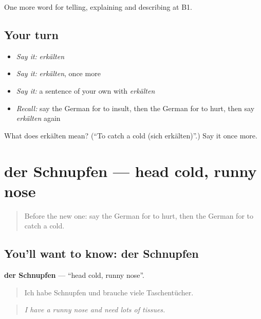 \begin{grammarlens}[title={What you've built}]
One more word for telling, explaining and describing at B1.
\end{grammarlens}

\subsection*{Your turn}
\begin{itemize}
\raggedright
  \item \emph{Say it:} \emph{erkälten}
  \item \emph{Say it:} \emph{erkälten}, once more
  \item \emph{Say it:} a sentence of your own with \emph{erkälten}
  \item \emph{Recall:} say the German for to insult, then the German for to hurt, then say \emph{erkälten} again
\end{itemize}

\begin{tcolorbox}[breakable,colback=teal!4,colframe=teal!35!black,title={Before you move on}]
What does erkälten mean? (\textquotedblleft{}To catch a cold (sich erkälten)\textquotedblright{}.) Say it once more.
\end{tcolorbox}
\section[der Schnupfen]{der Schnupfen — head cold, runny nose}

\label{lesson:GE-C479-schnupfen}



\begin{quote}
Before the new one: say the German for to hurt, then the German for to catch a cold.
\end{quote}

\subsection*{You'll want to know: der Schnupfen}
\textbf{der Schnupfen} — \textquotedblleft{}head cold, runny nose\textquotedblright{}.

\begin{quote}
Ich habe Schnupfen und brauche viele Taschentücher.
\end{quote}

\begin{quote}
\emph{I have a runny nose and need lots of tissues.}
\end{quote}

